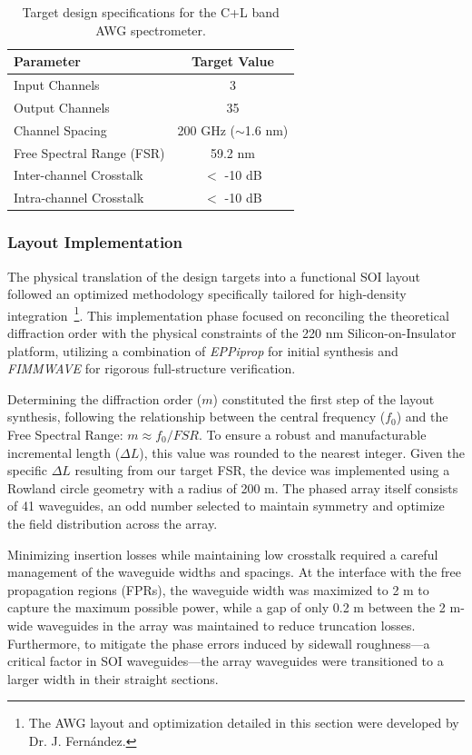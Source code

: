 \begin{table}[htbp]
    \centering
    \caption{Target design specifications for the C+L band AWG spectrometer.}
    \label{tab:awg_specs}
    \begin{tabular}{lc}
        \hline
        \textbf{Parameter} & \textbf{Target Value} \\ \hline
        Input Channels & 3 \\
        Output Channels & 35 \\
        Channel Spacing & 200 GHz ($\sim$1.6 nm) \\
        Free Spectral Range (FSR) & 59.2 nm \\
        Inter-channel Crosstalk & $<$ -10 dB \\
        Intra-channel Crosstalk & $<$ -10 dB \\ \hline
    \end{tabular}
\end{table}

\FloatBarrier

\subsubsection{Layout Implementation}

The physical translation of the design targets into a functional SOI layout followed an optimized 
methodology specifically tailored for high-density integration~\footnote{The AWG layout and 
optimization detailed in this section were developed by Dr. J. Fernández.}. This implementation 
phase focused on reconciling the theoretical diffraction order with the physical constraints of the 
220 nm Silicon-on-Insulator platform, utilizing a combination of \textit{EPPiprop} for initial 
synthesis and \textit{FIMMWAVE} for rigorous full-structure verification.

Determining the diffraction order ($m$) constituted the first step of the layout synthesis, 
following the relationship between the central frequency ($f_0$) and the Free Spectral Range: 
$m \approx f_0 / FSR$. To ensure a robust and manufacturable incremental length ($\Delta L$), this 
value was rounded to the nearest integer. Given the specific $\Delta L$ resulting from our target 
FSR, the device was implemented using a Rowland circle geometry with a radius of 200 \textmu m. 
The phased array itself consists of 41 waveguides, an odd number selected to maintain symmetry and 
optimize the field distribution across the array.

Minimizing insertion losses while maintaining low crosstalk required a careful management of the 
waveguide widths and spacings. At the interface with the free propagation regions (FPRs), the 
waveguide width was maximized to 2 \textmu m to capture the maximum possible power, while a gap of 
only 0.2 \textmu m between the 2 \textmu m-wide waveguides in the array was maintained to reduce 
truncation losses. Furthermore, to mitigate the phase errors induced by sidewall roughness—a 
critical factor in SOI waveguides—the array waveguides were transitioned to a larger width in 
their straight sections. 

